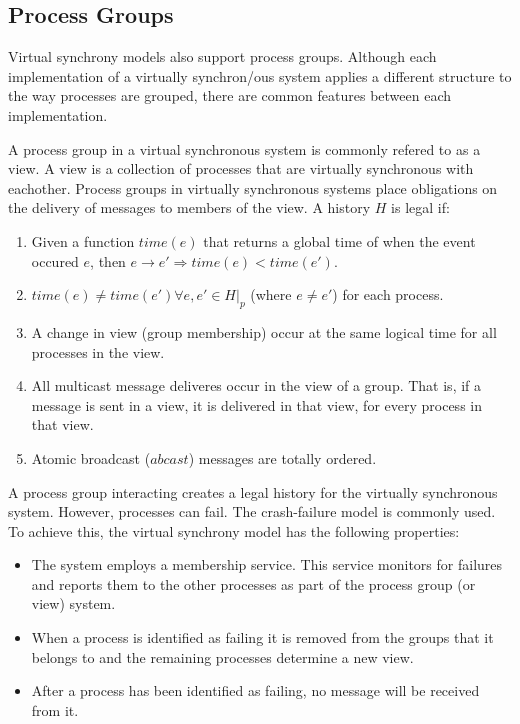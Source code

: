 \subsection{Process Groups}

Virtual synchrony models also support process groups. Although each
implementation of a virtually synchron/ous system applies a different structure
to the way processes are grouped, there are common features between each
implementation.

A process group in a virtual synchronous system is commonly refered to as a
view. A view is a collection of processes that are virtually synchronous
with eachother. Process groups in virtually synchronous systems place 
obligations on the delivery of messages to members of the view. A history
$H$ is legal if:

\begin{enumerate}
    \item Given a function $time(e)$ that returns a global time of when the event occured $e$, then $e \rightarrow e' \Rightarrow time(e) < time(e').$
    \item $time(e) \neq time(e') \forall e, e' \in H|_{p}$ (where $e \neq e'$) for each process.
    \item A change in view (group membership) occur at the same logical time for all processes in the view.
    \item All multicast message deliveres occur in the view of a group. That is, if a message is sent in a view, it is delivered in that view, for every process in that view.
    \item Atomic broadcast ($abcast$) messages are totally ordered.
\end{enumerate}

A process group interacting creates a legal history for the virtually
synchronous system. However, processes can fail. The crash-failure model is
commonly used. To achieve this, the virtual synchrony model has the following
properties:

\begin{itemize}
    \item The system employs a membership service. This service monitors for failures and reports them to the other processes as part of the process group (or view) system.
    \item When a process is identified as failing it is removed from the groups that it belongs to and the remaining processes determine a new view.
    \item After a process has been identified as failing, no message will be received from it.
\end{itemize}

